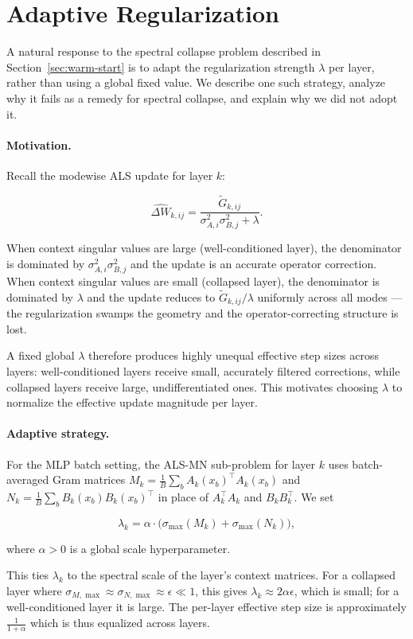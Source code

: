 \documentclass{article}
\begin{document}
\section{Adaptive Regularization}
\label{app:adaptive-lambda}

A natural response to the spectral collapse problem described in Section~\ref{sec:warm-start}
is to adapt the regularization strength $\lambda$ per layer, rather than using a global
fixed value. We describe one such strategy, analyze why it fails as a remedy for spectral
collapse, and explain why we did not adopt it.

\paragraph{Motivation.}
Recall the modewise ALS update for layer $k$:

\[
\widehat{\Delta W}_{k,ij} = \frac{\tilde G_{k,ij}}{\sigma_{A,i}^2 \sigma_{B,j}^2 + \lambda}.
\]

When context singular values are large (well-conditioned layer), the denominator is
dominated by $\sigma_{A,i}^2 \sigma_{B,j}^2$ and the update is an accurate operator
correction. When context singular values are small (collapsed layer), the denominator
is dominated by $\lambda$ and the update reduces to $\tilde G_{k,ij} / \lambda$
uniformly across all modes --- the regularization swamps the geometry and the
operator-correcting structure is lost.

A fixed global $\lambda$ therefore produces highly unequal effective step sizes
across layers: well-conditioned layers receive small, accurately filtered corrections,
while collapsed layers receive large, undifferentiated ones. This motivates choosing
$\lambda$ to normalize the effective update magnitude per layer.

\paragraph{Adaptive strategy.}
For the MLP batch setting, the ALS-MN sub-problem for layer $k$ uses
batch-averaged Gram matrices $M_k = \frac{1}{B}\sum_b A_k(x_b)^\top A_k(x_b)$
and $N_k = \frac{1}{B}\sum_b B_k(x_b) B_k(x_b)^\top$ in place of $A_k^\top A_k$
and $B_k B_k^\top$. We set

\[
\lambda_k = \alpha \cdot \bigl(\sigma_{\max}(M_k) + \sigma_{\max}(N_k)\bigr),
\]

where $\alpha > 0$ is a global scale hyperparameter.

This ties $\lambda_k$ to the spectral scale of the layer's context matrices.
For a collapsed layer where $\sigma_{M,\max} \approx \sigma_{N,\max} \approx \epsilon \ll 1$,
this gives $\lambda_k \approx 2\alpha\epsilon$, which is small; for a well-conditioned
layer it is large. The per-layer effective step size is approximately $\frac{1}{1 +\alpha}$ which
is thus equalized across layers.
\end{document}
